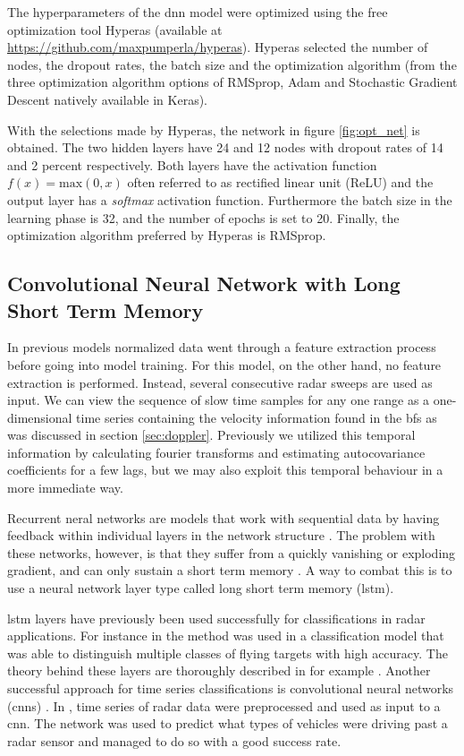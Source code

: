 The hyperparameters of the \gls{dnn} model were optimized using the free optimization tool Hyperas (available at \url{https://github.com/maxpumperla/hyperas}). Hyperas selected the number of nodes, the dropout rates, the batch size and the optimization algorithm (from the three optimization algorithm options of RMSprop, Adam and Stochastic Gradient Descent natively available in Keras). 

With the selections made by Hyperas, the network in figure \ref{fig:opt_net} is obtained. The two hidden layers have 24 and 12 nodes with dropout rates of 14 and 2 percent respectively. Both layers have the activation function $f(x)=\textrm{max}(0,x)$ often referred to as rectified linear unit (ReLU) and the output layer has a \textit{softmax} activation function. Furthermore the batch size in the learning phase is 32, and the number of epochs is set to 20. Finally, the optimization algorithm preferred by Hyperas is RMSprop.

\subsection{Convolutional Neural Network with Long Short Term Memory}

In previous models normalized data went through a feature extraction process before going into model training. For this model, on the other hand, no feature extraction is performed. Instead, several consecutive radar sweeps are used as input. We can view the sequence of slow time samples for any one range as a one-dimensional time series containing the velocity information found in the \gls{bf}s as was discussed in section \ref{sec:doppler}. Previously we utilized this temporal information by calculating fourier transforms and estimating autocovariance coefficients for a few lags, but we may also exploit this temporal behaviour in a more immediate way.

Recurrent neral networks are models that work with sequential data by having feedback within individual layers in the network structure \citep{karim_majumdar_darabi_chen_2018}. The problem with these networks, however, is that they suffer from a quickly vanishing or exploding gradient, and can only sustain a short term memory \citep{pascanu_mikolov_bengio_2013}. A way to combat this is to use a neural network layer type called long short term memory (\gls{lstm}).

\gls{lstm} layers have previously been used successfully for classifications in radar applications. For instance in \citep{jithesh_sagayaraj_srinivasa_2017} the method was used in a classification model that was able to distinguish multiple classes of flying targets with high accuracy. The theory behind these layers are thoroughly described in for example \citep{hochreiter_schmidhuber_1997}. Another successful approach for time series classifications is convolutional neural networks (\gls{cnn}s) \citep{karim_majumdar_darabi_chen_2018}. In \citep{capobianco_facheris_cuccoli_marinai_2018}, time series of radar data were preprocessed and used as input to a \gls{cnn}. The network was used to predict what types of vehicles were driving past a radar sensor and managed to do so with a good success rate.

